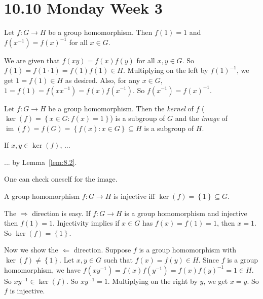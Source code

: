 \documentclass{notes}
\begin{document}
\newpage

\section{10.10 Monday Week 3}

\begin{lem}
  Let $f \colon G \to H$ be a group homomorphism.
  Then $f(1) = 1$ and $f\left ( x^{-1} \right ) = f(x)^{-1}$ for all $x \in G$.
\end{lem}

\begin{prf}
  We are given that $f(x y) = f(x) f(y)$ for all $x, y \in G$.
  So $f(1) = f(1 \cdot 1) = f(1) f(1) \in H$.
  Multiplying on the left by $f(1)^{-1}$, we get $1 = f(1) \in H$ as desired.
  Also, for any $x \in G$, $1 = f(1) = f\left ( x x^{-1} \right ) = f(x) f\left ( x^{-1} \right )$.
  So $f\left ( x^{-1} \right ) = f(x)^{-1}$.
\end{prf}

\begin{lem}
  Let $f \colon G \to H$ be a group homomorphism.
  Then the \textit{kernel} of $f$ ($\ker(f) = \left \{ x \in G : f(x) = 1 \right \}$) is a subgroup of $G$ and the \textit{image} of $\operatorname{im}(f) = f(G) = \left \{ f(x) : x \in G \right \} \subseteq H$ is a subgroup of $H$.
\end{lem}

\begin{prf}
  If $x, y \in \ker(f)$, ...

  ... by Lemma~\ref{lem:8.2}.

  One can check oneself for the image.
\end{prf}

\begin{lem}
  A group homomorphism $f \colon G \to H$ is injective iff $\ker(f) = \left \{ 1 \right \} \subseteq G$. 
\end{lem}

\begin{prf}
  The $\Rightarrow$ direction is easy.
  If $f \colon G \to H$ is a group homomorphism and injective then $f(1) = 1$.
  Injectivity implies if $x \in G$ has $f(x) = f(1) = 1$, then $x = 1$.
  So $\ker(f) = \left \{ 1 \right \}$.

  Now we show the $\Leftarrow$ direction.
  Suppose $f$ is a group homomorphism with $\ker(f) \neq \left \{ 1 \right \}$.
  Let $x, y \in G$ such that $f(x) = f(y) \in H$.
  Since $f$ is a group homomorphism, we have $f\left ( x y^{-1} \right ) = f(x) f\left ( y^{-1} \right ) = f(x) f(y)^{-1} = 1 \in H$.
  So $x y^{-1} \in \ker(f)$.
  So $x y^{-1} = 1$.
  Multiplying on the right by $y$, we get $x = y$.
  So $f$ is injective.
\end{prf}
\end{document}
